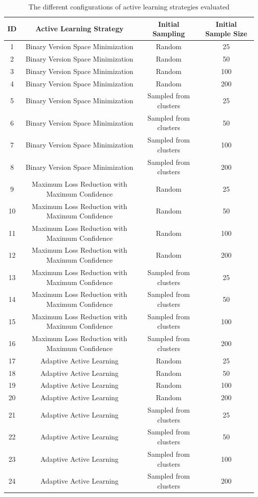 \begin{table}
    \begin{tabular}{|cccc|}
        \hline
        \textbf{ID} & \textbf{Active Learning Strategy} & \textbf{Initial Sampling} & \textbf{Initial Sample Size}\\
        \hline
        1 & Binary Version Space Minimization & Random & 25\\
        2 & Binary Version Space Minimization & Random & 50\\
        3 & Binary Version Space Minimization & Random & 100\\
        4 & Binary Version Space Minimization & Random & 200\\
        5 & Binary Version Space Minimization & Sampled from clusters & 25\\
        6 & Binary Version Space Minimization & Sampled from clusters & 50\\
        7 & Binary Version Space Minimization & Sampled from clusters & 100\\
        8 & Binary Version Space Minimization & Sampled from clusters & 200\\
        9 & Maximum Loss Reduction with Maximum Confidence & Random & 25\\
        10 & Maximum Loss Reduction with Maximum Confidence & Random & 50\\
        11 & Maximum Loss Reduction with Maximum Confidence & Random & 100\\
        12 & Maximum Loss Reduction with Maximum Confidence & Random & 200\\
        13 & Maximum Loss Reduction with Maximum Confidence & Sampled from clusters & 25\\
        14 & Maximum Loss Reduction with Maximum Confidence & Sampled from clusters & 50\\
        15 & Maximum Loss Reduction with Maximum Confidence & Sampled from clusters & 100\\
        16 & Maximum Loss Reduction with Maximum Confidence & Sampled from clusters & 200\\
        17 & Adaptive Active Learning & Random & 25\\
        18 & Adaptive Active Learning & Random & 50\\
        19 & Adaptive Active Learning & Random & 100\\
        20 & Adaptive Active Learning & Random & 200\\
        21 & Adaptive Active Learning & Sampled from clusters & 25\\
        22 & Adaptive Active Learning & Sampled from clusters & 50\\
        23 & Adaptive Active Learning & Sampled from clusters & 100\\
        24 & Adaptive Active Learning & Sampled from clusters & 200\\
        \hline
    \end{tabular}
    \caption{The different configurations of active learning strategies evaluated}
    \label{fig:active-learning-configurations}
\end{table}

